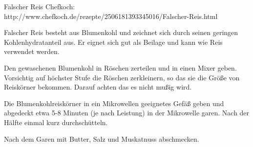\begin{recipe}[]{ Falscher Reis }{ Chefkoch: http://www.chefkoch.de/rezepte/2506181393345016/Falscher-Reis.html }{  }

Falscher Reis besteht aus Blumenkohl und zeichnet sich durch seinen geringen Kohlenhydratanteil aus. Er eignet sich gut als Beilage und kann wie Reis verwendet werden.



\step
Den gewaschenen Blumenkohl in Röschen zerteilen und in einen Mixer geben. Vorsichtig auf höchster Stufe die Röschen zerkleinern, so das sie die Größe von Reiskörner bekommen. Darauf achten das es nicht mußig wird. 

\step
Die Blumenkohlreiskörner in ein Mikrowellen geeignetes Gefäß geben und abgedeckt etwa 5-8 Minuten (je nach Leistung) in der Mikrowelle garen. Nach der Hälfte einmal kurz durchschütteln.

\step
Nach dem Garen mit Butter, Salz und Muskatnuss abschmecken.


\end{recipe}